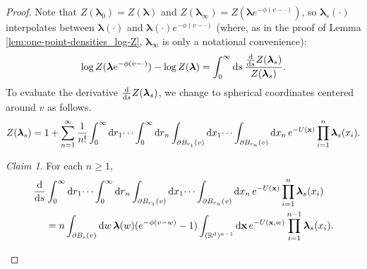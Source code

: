 \documentclass[11pt]{article}
\newcommand{\R}{\mathbb R}
\newcommand{\bl}{\bm{\lambda}}
\newcommand{\bx}{\vb{x}}
\numberwithin{equation}{section}
\theoremstyle{plain}
\theoremstyle{definition}
\theoremstyle{remark}
\newtheorem{claim}[theorem]{Claim}
\begin{document}
\begin{proof}
Note that $Z(\bl_{0})=Z(\bl)$ and $Z(\bl_{\infty})=Z(\bl e^{-\phi(v-\cdot)})$, so $\bl_{s}(\cdot)$ interpolates between $\bl(\cdot)$ and $\bl(\cdot)e^{-\phi(v-\cdot)}$ (where, as in the proof of Lemma \ref{lem:one-point-densities_log-Z}, $\bl_{\infty}$ is only a notational convenience):
\begin{equation}
\log Z(\bl e^{-\phi(v-\cdot)})-\log Z(\bl)
=\int_{0}^{\infty}\dd{s}\frac{\dv{s}Z(\bl_{s})}{Z(\bl_{s})}.
\end{equation}
To evaluate the derivative $\dv{s}Z(\bl_{s})$, we change to spherical coordinates centered around $v$ as follows.
\begin{equation}
\begin{multlined}
Z(\bl_{s})=1+\sum_{n=1}^{\infty}\frac{1}{n!}\int_{0}^{\infty}\dd{r}_{1}\dots\int_{0}^{\infty}\dd{r}_{n}\int_{\partial B_{r_{1}}(v)}\dd{x}_{1}\dots\int_{\partial B_{r_{n}}(v)}\dd{x}_{n} e^{-U(\bx)}\prod_{i=1}^{n}\bl_{s}(x_{i}).
\end{multlined}
\end{equation}

\begin{claim}
\label{clm:one-point-densities_derivative}
For each $n\ge 1$, 
\begin{equation}
\begin{multlined}
\dv{s}\int_{0}^{\infty}\dd{r}_{1}\dots\int_{0}^{\infty}\dd{r}_{n}\int_{\partial B_{r_{1}}(v)}\dd{x}_{1}\dots\int_{\partial B_{r_{n}}(v)}\dd{x}_{n} e^{-U(\bx)}\prod_{i=1}^{n}\bl_{s}(x_{i})
\\
=n\int_{\partial B_{s}(v)}\dd{w}\bl(w)(e^{-\phi(v-w)}-1)\int_{(\R^{d})^{n-1}}\dd{\bx}e^{-U(\bx,w)}\prod_{i=1}^{n-1}\bl_{s}(x_{i}).
\end{multlined}
\end{equation}
\end{claim}


\end{proof}
\end{document}
